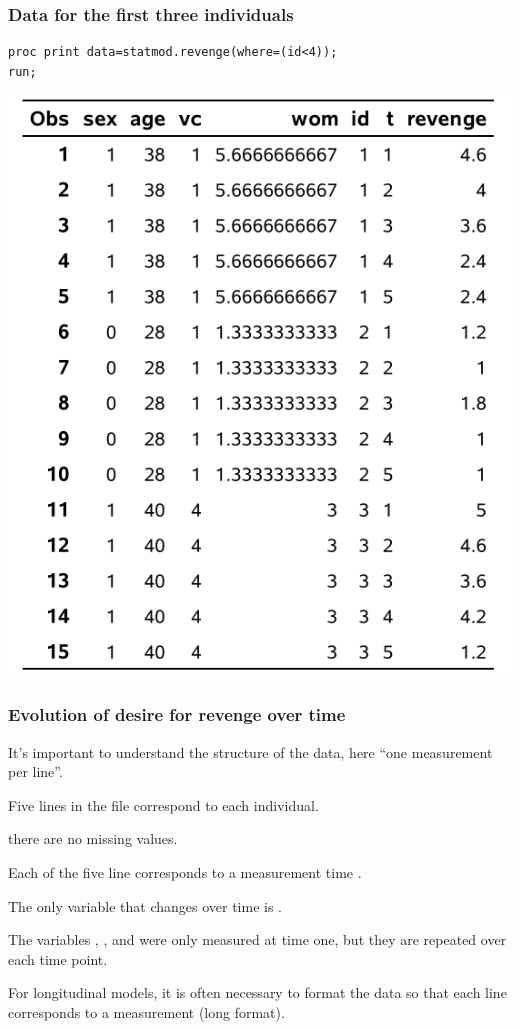 \documentclass{beamer}
\begin{document}
\begin{frame}[fragile]
\frametitle{Data for the first three individuals}
 
\begin{tcolorbox}[colback=white, colframe=hecblue, title=\SASlang{} code to print only selected records]
\begin{verbatim}
proc print data=statmod.revenge(where=(id<4)); 
run;
\end{verbatim}
\end{tcolorbox}
\begin{center}
\includegraphics[width = 0.43\linewidth]{img/c5/slides6-e01}
\end{center}
\end{frame}

\begin{frame}
\frametitle{Evolution of desire for revenge  over time}
\bi
\item It's important to understand the \alert{structure} of the data, here ``one measurement per line''. 
\item Five lines in the file correspond to each individual.
\bi \item there are no missing values.
\item Each of the five line corresponds to a measurement time .
\ei 
\item The only variable that changes over time is . 
\bi \item The variables , ,  and  were only measured at time one, but they are repeated over each time point. 
\ei
\item For longitudinal models, it is often necessary to format the data so that each line corresponds to a measurement (long format).
\ei
\end{frame}
\end{document}
